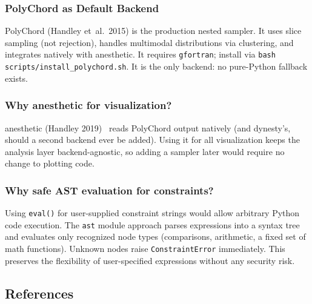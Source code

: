 \subsubsection{PolyChord as Default Backend}

PolyChord (Handley et~al.\ 2015) is the production nested sampler.
It uses slice sampling (not rejection), handles multimodal distributions
via clustering, and integrates natively with anesthetic.  It requires
\texttt{gfortran}; install via \texttt{bash scripts/install\_polychord.sh}.
It is the only backend: no pure-Python fallback exists.

\subsubsection{Why anesthetic for visualization?}

anesthetic (Handley 2019)~\cite{handley2019anesthetic} reads PolyChord output
natively (and dynesty's, should a second backend ever be added).  Using it for
all visualization keeps the analysis layer backend-agnostic, so adding a sampler
later would require no change to plotting code.

\subsubsection{Why safe AST evaluation for constraints?}

Using \texttt{eval()} for user-supplied constraint strings would allow arbitrary
Python code execution.  The \texttt{ast} module approach parses expressions into
a syntax tree and evaluates only recognized node types (comparisons, arithmetic,
a fixed set of math functions).  Unknown nodes raise \texttt{ConstraintError}
immediately.  This preserves the flexibility of user-specified expressions
without any security risk.

\subsection{References}
\label{sec:inference-references}

